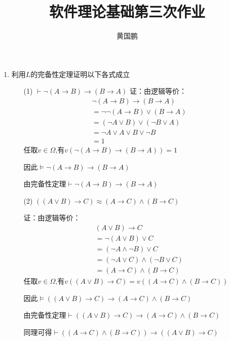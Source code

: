 \documentclass[11pt,oneside,a4paper]{article}
\author{黄国鹏}
\title{软件理论基础第三次作业 }
\begin{document}
\maketitle
\begin{enumerate}
    \item 利用$L$的完备性定理证明以下各式成立
    \begin{enumerate}
        \item[(1)] $\vdash \neg(A \rightarrow B) \rightarrow(B \rightarrow A)$
        证：由逻辑等价：
        \[\begin{array}{l}
            \neg (A \to B) \to (B \to A)\\
             = \neg \neg (A \to B) \vee (B \to A)\\
             = (\neg A \vee B) \vee (\neg B \vee A)\\
             = \neg A \vee A \vee B \vee \neg B\\
             = 1
            \end{array}\]
        任取$v \in \Omega$,有$v(\neg (A \to B) \to (B \to A))=1$
        
        因此$\models \neg (A \to B) \to (B \to A)$

        由完备性定理$\vdash \neg(A \rightarrow B) \rightarrow(B \rightarrow A)$


        \item[(2)]$((A \vee B) \rightarrow C) \approx(A \rightarrow C) \wedge(B \rightarrow C)$
        
        证：由逻辑等价：
        \[\begin{array}{l}
              (A \vee B) \to C\\
             = \neg (A \vee B) \vee C\\
             = (\neg A \wedge \neg B) \vee C\\
             = (\neg A \vee C) \wedge (\neg B \vee C)\\
             = (A \to C) \wedge (B \to C)
            \end{array}\]
        任取$v \in \Omega$,有$v((A \vee B) \to C) = v((A \to C) \wedge (B \to C))$

        因此$\models ((A \vee B) \rightarrow C) \to (A \rightarrow C) \wedge(B \rightarrow C)$

        由完备性定理$\vdash ((A \vee B) \rightarrow C) \to (A \rightarrow C) \wedge(B \rightarrow C)$

        同理可得$ \vdash ((A \to C) \wedge (B \to C)) \to ((A \vee B) \to C)$


\end{enumerate}
\end{enumerate}
\end{document}
